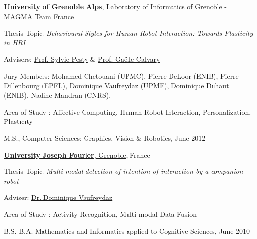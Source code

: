 \documentclass[10pt]{article}
\begin{document}
\begin{outerlist}
\begin{small}


\item[] \href{http://www.univ-grenoble-alpes.fr/}{\textbf{University of Grenoble Alps}}, \href{http://liglab.fr}{Laboratory of Informatics of Grenoble} - \href{http://magma.imag.fr}{MAGMA Team} France
        \begin{innerlist}
        \item Thesis Topic: \emph{Behavioural Styles for Human-Robot Interaction: Towards Plasticity in HRI}
        \item Advisers:
              \href{http://magma.imag.fr/content/sylvie-pesty}
                   {Prof. Sylvie Pesty} \& 
              \href{http://iihm.imag.fr/calvary/}
                   {Prof. Gaëlle Calvary}
        \item Jury Members: Mohamed Chetouani (UPMC), Pierre DeLoor (ENIB), Pierre Dillenbourg (EPFL), Dominique Vaufreydaz (UPMF), Dominique Duhaut (ENIB), Nadine Mandran (CNRS).
        \item Area of Study : Affective Computing, Human-Robot Interaction, Personalization, Plasticity
        \end{innerlist}
\end{small}
\end{outerlist}
\vspace{0.5cm}
M.S., {Computer Sciences: Graphics, Vision \& Robotics}, June 2012
\begin{outerlist}
\begin{small}
\item[] \href{https://www.ujf-grenoble.fr/?language=en}{\textbf{University Joseph Fourier}, Grenoble}, France 
        \begin{innerlist}
        \item Thesis Topic: \emph{Multi-modal detection of intention of interaction by a companion robot}
        \item Adviser:
              \href{https://team.inria.fr/prima/vaufreydaz/}
                   {Dr. Dominique Vaufreydaz}
        \item Area of Study : Activity Recognition, Multi-modal Data Fusion
        \end{innerlist}
\end{small}
\end{outerlist}
\vspace{0.5cm}
B.S. B.A. Mathematics and Informatics applied to Cognitive Sciences, June 2010
\end{document}
